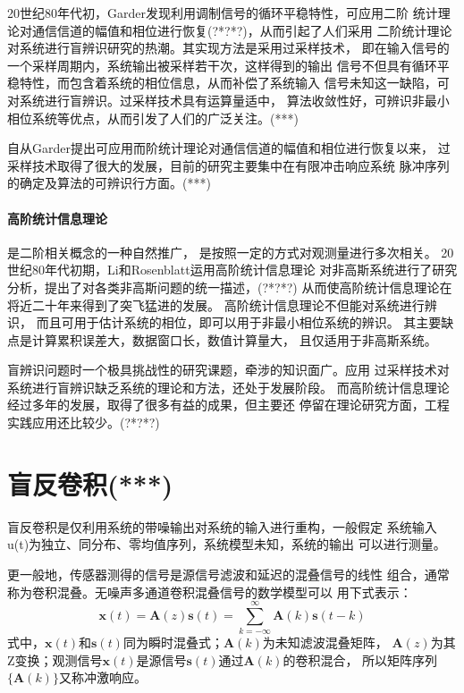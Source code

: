 20世纪80年代初，Garder发现利用调制信号的循环平稳特性，可应用二阶
统计理论对通信信道的幅值和相位进行恢复(?*?*?)，从而引起了人们采用
二阶统计理论对系统进行盲辨识研究的热潮。其实现方法是采用过采样技术，
即在输入信号的一个采样周期内，系统输出被采样若干次，这样得到的输出
信号不但具有循环平稳特性，而包含着系统的相位信息，从而补偿了系统输入
信号未知这一缺陷，可对系统进行盲辨识。过采样技术具有运算量适中，
算法收敛性好，可辨识非最小相位系统等优点，从而引发了人们的广泛关注。(***)

自从Garder提出可应用而阶统计理论对通信信道的幅值和相位进行恢复以来，
过采样技术取得了很大的发展，目前的研究主要集中在有限冲击响应系统
脉冲序列的确定及算法的可辨识行方面。(***)

\paragraph*{高阶统计信息理论}是二阶相关概念的一种自然推广，
是按照一定的方式对观测量进行多次相关。
20世纪80年代初期，Li和Rosenblatt运用高阶统计信息理论
对非高斯系统进行了研究分析，提出了对各类非高斯问题的统一描述，(?*?*?) 
从而使高阶统计信息理论在将近二十年来得到了突飞猛进的发展。
高阶统计信息理论不但能对系统进行辨识，
而且可用于估计系统的相位，即可以用于非最小相位系统的辨识。
其主要缺点是计算累积误差大，数据窗口长，数值计算量大，
且仅适用于非高斯系统。

盲辨识问题时一个极具挑战性的研究课题，牵涉的知识面广。应用
过采样技术对系统进行盲辨识缺乏系统的理论和方法，还处于发展阶段。
而高阶统计信息理论经过多年的发展，取得了很多有益的成果，但主要还
停留在理论研究方面，工程实践应用还比较少。(?*?*?)

\section{盲反卷积(***)}
盲反卷积是仅利用系统的带噪输出对系统的输入进行重构，一般假定
系统输入u(t)为独立、同分布、零均值序列，系统模型未知，系统的输出
可以进行测量。

    更一般地，传感器测得的信号是源信号滤波和延迟的混叠信号的线性
组合，通常称为卷积混叠。无噪声多通道卷积混叠信号的数学模型可以
用下式表示：
\begin{equation} 
\bm{x}(t)=\bm{A}(z)\bm{s}(t) = 
\sum^\infty_{k=-\infty}\bm{A}(k)\bm{s}(t-k)
\end{equation}
式中，$\bm{x}(t)$和$\bm{s}(t)$同为瞬时混叠式；$\bm{A}(k)$为未知滤波混叠矩阵，
$\bm{A}(z)$为其Z变换；观测信号$\bm{x}(t)$是源信号$\bm{s}(t)$通过$\bm{A}(k)$的卷积混合，
所以矩阵序列$\{\bm{A}(k)\}$又称冲激响应。
    
